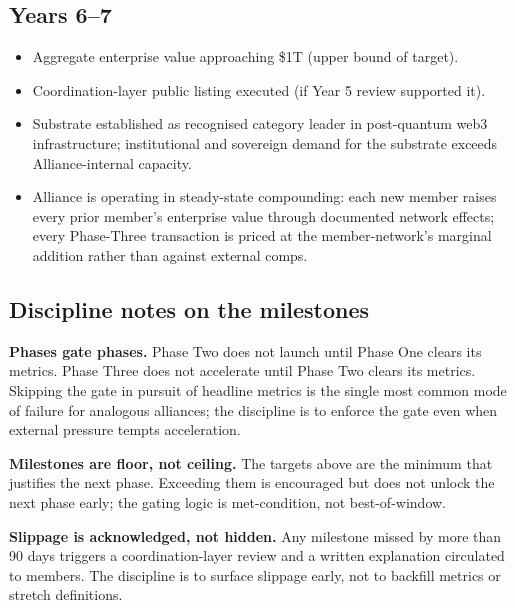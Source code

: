\subsection{Years 6--7}

\begin{itemize}[leftmargin=2em,itemsep=0.1em]
\item Aggregate enterprise value approaching \$1T (upper bound of
target).
\item Coordination-layer public listing executed (if Year 5 review
supported it).
\item Substrate established as recognised category leader in
post-quantum web3 infrastructure; institutional and sovereign demand
for the substrate exceeds Alliance-internal capacity.
\item Alliance is operating in steady-state compounding: each new
member raises every prior member's enterprise value through documented
network effects; every Phase-Three transaction is priced at the
member-network's marginal addition rather than against external comps.
\end{itemize}

\subsection{Discipline notes on the milestones}

\textbf{Phases gate phases.} Phase Two does not launch until Phase One
clears its metrics. Phase Three does not accelerate until Phase Two
clears its metrics. Skipping the gate in pursuit of headline metrics is
the single most common mode of failure for analogous alliances; the
discipline is to enforce the gate even when external pressure tempts
acceleration.

\textbf{Milestones are floor, not ceiling.} The targets above are the
minimum that justifies the next phase. Exceeding them is encouraged but
does not unlock the next phase early; the gating logic is met-condition,
not best-of-window.

\textbf{Slippage is acknowledged, not hidden.} Any milestone missed by
more than 90 days triggers a coordination-layer review and a written
explanation circulated to members. The discipline is to surface
slippage early, not to backfill metrics or stretch definitions.
